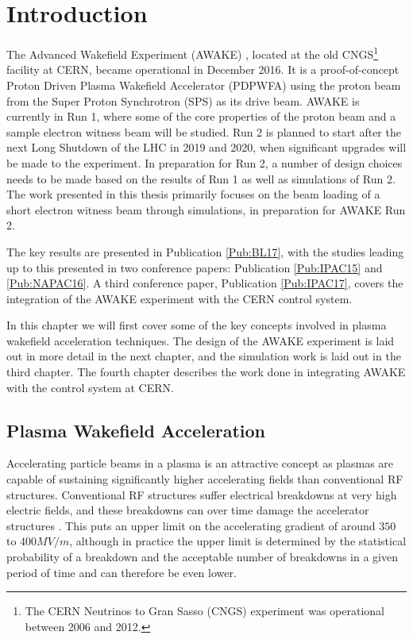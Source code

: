 %
%

\chapter{Introduction}
\label{Ch:Intro}

The Advanced Wakefield Experiment (AWAKE) \cite{awake_collaboration:2014}, located at the old CNGS\footnote{The CERN Neutrinos to Gran Sasso (CNGS) experiment was operational between 2006 and 2012.} facility at CERN, became operational in December 2016. It is a proof-of-concept Proton Driven Plasma Wakefield Accelerator (PDPWFA) using the proton beam from the Super Proton Synchrotron (SPS) as its drive beam. AWAKE is currently in Run 1, where some of the core properties of the proton beam and a sample electron witness beam will be studied. Run 2 is planned to start after the next Long Shutdown of the LHC in 2019 and 2020, when significant upgrades will be made to the experiment. In preparation for Run 2, a number of design choices needs to be made based on the results of Run 1 as well as simulations of Run 2. The work presented in this thesis primarily focuses on the beam loading of a short electron witness beam through simulations, in preparation for AWAKE Run 2.

The key results are presented in Publication \ref{Pub:BL17}, with the studies leading up to this presented in two conference papers: Publication \ref{Pub:IPAC15} and \ref{Pub:NAPAC16}. A third conference paper, Publication \ref{Pub:IPAC17}, covers the integration of the AWAKE experiment with the CERN control system.

In this chapter we will first cover some of the key concepts involved in plasma wakefield acceleration techniques. The design of the AWAKE experiment is laid out in more detail in the next chapter, and the simulation work is laid out in the third chapter. The fourth chapter describes the work done in integrating AWAKE with the control system at CERN.

\section{Plasma Wakefield Acceleration}
\label{Int:PWFA}

Accelerating particle beams in a plasma is an attractive concept as plasmas are capable of sustaining significantly higher accelerating fields than conventional RF structures. Conventional RF structures suffer electrical breakdowns at very high electric fields, and these breakdowns can over time damage the accelerator structures \cite{braun:2003}. This puts an upper limit on the accelerating gradient of around $350$ to $400\unit{MV/m}$, although in practice the upper limit is determined by the statistical probability of a breakdown and the acceptable number of breakdowns in a given period of time \cite{pritzkau:2002} and can therefore be even lower.


